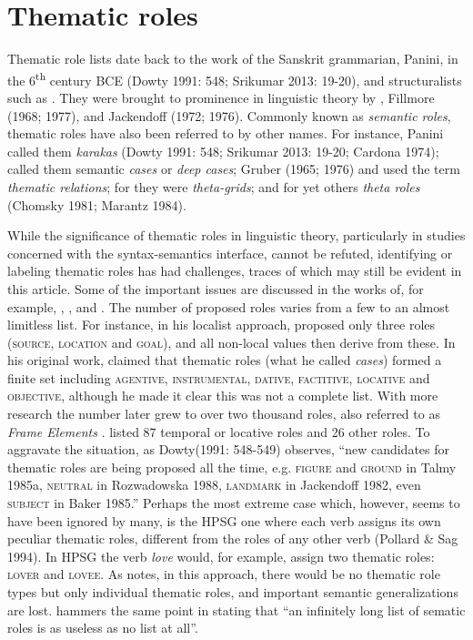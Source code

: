 \documentclass[output=paper]{langsci/langscibook}
\begin{document}
\section{Thematic roles}

Thematic role lists date back to the work of the Sanskrit grammarian, Panini, in the 6\textsuperscript{th} century BCE (Dowty 1991: 548; Srikumar 2013: 19-20), and structuralists such as \citet{Blake1930}. They were brought to prominence in linguistic theory by \citet{Gruber1965}, Fillmore (1968; 1977), and Jackendoff (1972; 1976). Commonly known as \textit{semantic roles}, thematic roles have also been referred to by other names. For instance, Panini called them \textit{karakas }(Dowty 1991: 548; Srikumar 2013: 19-20; Cardona 1974); \citet{Fillmore1968} called them semantic \textit{cases} or \textit{deep cases}; Gruber (1965; 1976) and \citet{Jackendoff1972} used the term \textit{thematic relations}; for \citet{Stowell1981} they were \textit{theta-grids}; and for yet others \textit{theta roles} (Chomsky 1981; Marantz 1984). 

While the significance of thematic roles in linguistic theory, particularly in studies concerned with the syntax-semantics interface, cannot be refuted, identifying or labeling thematic roles has had challenges, traces of which may still be evident in this article. Some of the important issues are discussed in the works of, for example, \citet{Dowty1991}, \citet{Jackendoff1987}, \citet[689]{Newmeyer2010} and \citet[6]{KittilaEtAl2011}. The number of proposed roles varies from a few to an almost limitless list. For instance, in his localist approach, \citet{Anderson1971} proposed only three roles (\textsc{source, location} and \textsc{goal}), and all non-local values then derive from these. In his original work, \citet{Fillmore1968} claimed that thematic roles (what he called \textit{cases}) formed a finite set including \textsc{agentive, instrumental, dative, factitive, locative} and \textsc{objective,} although he made it clear this was not a complete list. With more research the number later grew to over two thousand roles, also referred to as \textit{Frame Elements} \citep{Fillmore1985}. \citet{Blake1930} listed 87 temporal or locative roles and 26 other roles. To aggravate the situation, as Dowty\textit {}(1991: 548-549) observes, “new candidates for thematic roles are being proposed all the time, e.g. \textsc{figure} and \textsc{ground} in Talmy 1985a, \textsc{neutral} in Rozwadowska 1988, \textsc{landmark} in Jackendoff 1982, even \textsc{subject} in Baker 1985.” Perhaps the most extreme case which, however, seems to have been ignored by many, is the HPSG one where each verb assigns its own peculiar thematic roles, different from the roles of any other verb (Pollard \& Sag 1994). In HPSG the verb \textit{love} would, for example, assign two thematic roles: \textsc{lover} and \textsc{lovee}. As \citet{Dowty1989} notes, in this approach, there would be no thematic role types but only individual thematic roles, and important semantic generalizations are lost. \citet[52]{Payne1997} hammers the same point in stating that “an infinitely long list of sematic roles is as useless as no list at all”.
\end{document}
